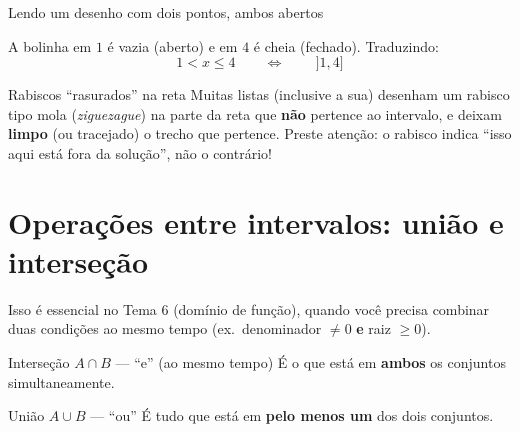 \documentclass[12pt,a4paper]{article}
\newcommand{\bolaFechada}[1]{\filldraw[blue] (#1,0) circle (2.2pt);}
\newcommand{\bolaAberta}[1]{\draw[blue,fill=white,thick] (#1,0) circle (2.2pt);}
\begin{document}
\begin{exemplo}{Lendo um desenho com dois pontos, ambos abertos}
\begin{center}
\end{center}
A bolinha em $1$ é vazia (aberto) e em $4$ é cheia (fechado). Traduzindo:
\[
1 < x \le 4 \qquad\Longleftrightarrow\qquad \,]1,4]
\]
\end{exemplo}

\begin{atencao}{Rabiscos ``rasurados'' na reta}
Muitas listas (inclusive a sua) desenham um rabisco tipo mola
(\emph{ziguezague}) na parte da reta que \textbf{não} pertence ao
intervalo, e deixam \textbf{limpo} (ou tracejado) o trecho que pertence.
Preste atenção: o rabisco indica ``isso aqui está fora da solução'', não o
contrário!
\end{atencao}

\section{Operações entre intervalos: união e interseção}

Isso é essencial no Tema 6 (domínio de função), quando você precisa
combinar duas condições ao mesmo tempo (ex.\ denominador $\neq 0$
\textbf{e} raiz $\ge 0$).

\begin{definicao}{Interseção $A \cap B$ — ``e'' (ao mesmo tempo)}
É o que está em \textbf{ambos} os conjuntos simultaneamente.
\end{definicao}

\begin{definicao}{União $A \cup B$ — ``ou''}
É tudo que está em \textbf{pelo menos um} dos dois conjuntos.
\end{definicao}
\end{document}
